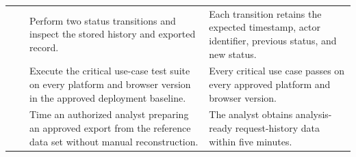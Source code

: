 \begin{tabularx}{\linewidth}{L{2.1cm}L{3.0cm}YL{5.0cm}}
 &  & Perform two status transitions and inspect the stored history and exported record. & Each transition retains the expected timestamp, actor identifier, previous status, and new status.\\
 &  & Execute the critical use-case test suite on every platform and browser version in the approved deployment baseline. & Every critical use case passes on every approved platform and browser version.\\
 &  & Time an authorized analyst preparing an approved export from the reference data set without manual reconstruction. & The analyst obtains analysis-ready request-history data within five minutes.\\
\bottomrule
\end{tabularx}
